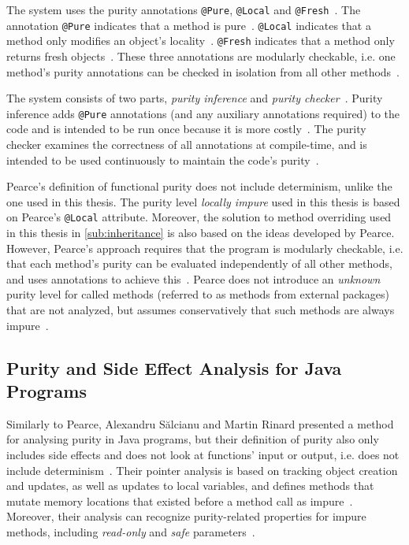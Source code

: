 \documentclass[a4paper,12pt]{article}
\begin{document}
The system uses the purity annotations \texttt{@Pure}, \texttt{@Local} and \texttt{@Fresh}~\cite{pearce2011jpure}. The annotation \texttt{@Pure} indicates that a method is pure~\cite{pearce2011jpure}. \texttt{@Local} indicates that a method only modifies an object's locality~\cite{pearce2011jpure}. \texttt{@Fresh} indicates that a method only returns fresh objects~\cite{pearce2011jpure}. These three annotations are modularly checkable, i.e. one method's purity annotations can be checked in isolation from all other methods~\cite{pearce2011jpure}.

The system consists of two parts, \textit{purity inference} and \textit{purity checker}~\cite{pearce2011jpure}. Purity inference adds \texttt{@Pure} annotations (and any auxiliary annotations required) to the code and is intended to be run once because it is more costly~\cite{pearce2011jpure}. The purity checker examines the correctness of all annotations at compile-time, and is intended to be used continuously to maintain the code's purity~\cite{pearce2011jpure}.

Pearce's definition of functional purity does not include determinism, unlike the one used in this thesis. The purity level \textit{locally impure} used in this thesis is based on Pearce's \texttt{@Local} attribute. Moreover, the solution to method overriding used in this thesis in \autoref{sub:inheritance} is also based on the ideas developed by Pearce. However, Pearce's approach requires that the program is modularly checkable, i.e. that each method's purity can be evaluated independently of all other methods, and uses annotations to achieve this~\cite{pearce2011jpure}.  Pearce does not introduce an \textit{unknown} purity level for called methods (referred to as methods from external packages) that are not analyzed, but assumes conservatively that such methods are always impure~\cite{pearce2011jpure}.


\subsection{Purity and Side Effect Analysis for Java Programs} \label{sub:Purity and Side Effect Analysis for Java Programs}

Similarly to Pearce, Alexandru S\u{a}lcianu and Martin Rinard presented a method for analysing purity in Java programs, but their definition of purity also only includes side effects and does not look at functions' input or output, i.e. does not include determinism~\cite{salcianu}. Their pointer analysis is based on tracking object creation and updates, as well as updates to local variables, and defines methods that mutate memory locations that existed before a method call as impure~\cite{salcianu}. Moreover, their analysis can recognize purity-related properties for impure methods, including \textit{read-only} and \textit{safe} parameters~\cite{salcianu}.
\end{document}
